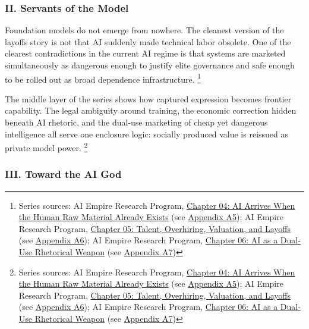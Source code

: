 \documentclass[
  american,
  11pt,
  letterpaper,
]{article}
\begin{document}
\subsubsection{II. Servants of the
Model}\label{ii.-servants-of-the-model}

Foundation models do not emerge from nowhere. The cleanest version of
the layoffs story is not that AI suddenly made technical labor obsolete.
One of the clearest contradictions in the current AI regime is that
systems are marketed simultaneously as dangerous enough to justify elite
governance and safe enough to be rolled out as broad dependence
infrastructure. \footnote{Series sources: AI Empire Research Program,
  \href{04_data-models-weights_paper.html}{Chapter 04: AI Arrives When
  the Human Raw Material Already Exists} (see
  \hyperref[appendix-a5-chapter-04-ai-arrives-when-the-human-raw-material-already-exists]{Appendix
  A5}); AI Empire Research Program,
  \href{05_talent-overhiring-layoffs_paper.html}{Chapter 05: Talent,
  Overhiring, Valuation, and Layoffs} (see
  \hyperref[appendix-a6-chapter-05-talent-overhiring-valuation-and-layoffs]{Appendix
  A6}); AI Empire Research Program,
  \href{06_dual-use-rhetorical-weapon_paper.html}{Chapter 06: AI as a
  Dual-Use Rhetorical Weapon} (see
  \hyperref[appendix-a7-chapter-06-ai-as-a-dual-use-rhetorical-weapon]{Appendix
  A7})}

The middle layer of the series shows how captured expression becomes
frontier capability. The legal ambiguity around training, the economic
correction hidden beneath AI rhetoric, and the dual-use marketing of
cheap yet dangerous intelligence all serve one enclosure logic: socially
produced value is reissued as private model power. \footnote{Series
  sources: AI Empire Research Program,
  \href{04_data-models-weights_paper.html}{Chapter 04: AI Arrives When
  the Human Raw Material Already Exists} (see
  \hyperref[appendix-a5-chapter-04-ai-arrives-when-the-human-raw-material-already-exists]{Appendix
  A5}); AI Empire Research Program,
  \href{05_talent-overhiring-layoffs_paper.html}{Chapter 05: Talent,
  Overhiring, Valuation, and Layoffs} (see
  \hyperref[appendix-a6-chapter-05-talent-overhiring-valuation-and-layoffs]{Appendix
  A6}); AI Empire Research Program,
  \href{06_dual-use-rhetorical-weapon_paper.html}{Chapter 06: AI as a
  Dual-Use Rhetorical Weapon} (see
  \hyperref[appendix-a7-chapter-06-ai-as-a-dual-use-rhetorical-weapon]{Appendix
  A7})}

\subsubsection{III. Toward the AI God}\label{iii.-toward-the-ai-god}
\end{document}
